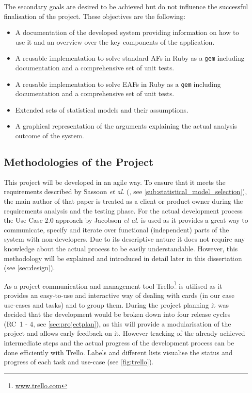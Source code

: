 \bigskip

The secondary goals are desired to be achieved but do not influence the successful finalisation of the project. These objectives are the following:
\begin{itemize}
	\item A documentation of the developed system providing information on how to use it and an overview over the key components of the application.
	\item A reusable implementation to solve standard \glspl{AF} in Ruby as a \texttt{gem} including documentation and a comprehensive set of unit tests.
	\item A reusable implementation to solve \glspl{EAF} in Ruby as a \texttt{gem} including documentation and a comprehensive set of unit tests.
	\item Extended sets of statistical models and their assumptions.
	\item A graphical representation of the arguments explaining the actual analysis outcome of the system.
\end{itemize}


\subsection{Methodologies of the Project}
\label{sub:methodologies}
This project will be developed in an agile way. To ensure that it meets the requirements described by Sassoon \textit{et al.} (\cite{sassoon2014, sassoon2016, sassoon2016CD}, see \autoref{sub:statistical_model_selection}), the main author of that paper is treated as a client or \gls{product owner} during the requirements analysis and the testing phase. For the actual development process the Use-Case 2.0 approach by Jacobson \textit{et al.} \cite{jacobson2011usecase} is used as it provides a great way to communicate, specify and iterate over functional (independent) parts of the system with non-developers. Due to its descriptive nature it does not require any knowledge about the actual process to be easily understandable. However, this methodology will be explained and introduced in detail later in this dissertation (see \autoref{sec:design}). 

As a project communication and management tool Trello\footnote{\href{http://www.trello.com}{www.trello.com}} is utilised as it provides an easy-to-use and interactive way of dealing with cards (in our case use-cases and tasks) and to group them. During the project planning it was decided that the development would be broken down into four release cycles (RC~1 - 4, see \autoref{sec:projectplan}), as this will provide a modularisation of the project and allows early feedback on it. However tracking of the already achieved intermediate steps and the actual progress of the development process can be done efficiently with Trello. Labels and different lists visualise the status and progress of each task and use-case (see \autoref{fig:trello}).


